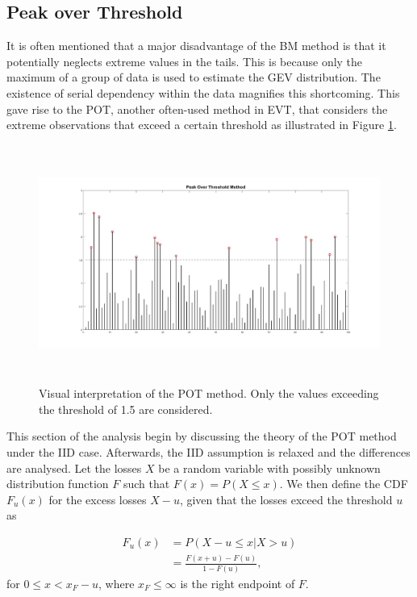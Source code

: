 \documentclass[a4paper,12pt]{article}
\theoremstyle{plain}
\begin{document}
\subsection{Peak over Threshold}
It is often mentioned that a major disadvantage of the BM method is that it potentially neglects extreme values in the tails. This is because only the maximum of a group of data is used to estimate the GEV distribution. The existence of serial dependency within the data magnifies this shortcoming. This gave rise to the POT, another often-used method in EVT, that considers the extreme observations that exceed a certain threshold as illustrated in Figure \ref{fig:peakoverthreshold}. \\

\begin{figure}[H]
\includegraphics[height=7.8cm, width=\linewidth]{Figures/peakoverthreshold_example2.jpg} 
\vspace{-0.8cm}
\captionsetup[figure]{font=small,labelfont=small}
\caption{Visual interpretation of the POT method. Only the values exceeding the threshold of 1.5 are considered.}
\label{fig:peakoverthreshold}
\end{figure}

This section of the analysis begin by discussing the theory of the POT method under the IID case. Afterwards, the IID assumption is relaxed and the differences are analysed. Let the losses $X$ be a random variable with possibly unknown distribution function $F$ such that $F(x) = P(X \leq x)$. We then define the CDF $F_u(x)$ for the excess losses $X-u$, given that the losses exceed the threshold $u$ as 

\begin{equation}
    \begin{split}
        F_u(x) &= P(X-u\leq x| X > u)\\
        & = \frac{F(x+u) - F(u)}{1 - F(u)},
    \end{split}
\end{equation}
for $0\leq x < x_F - u$, where $x_F\leq \infty$ is the right endpoint of $F$.\\
\end{document}
